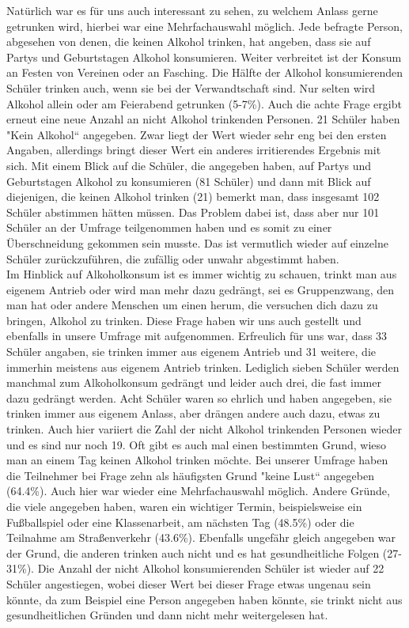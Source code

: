 \documentclass[12pt]{article}
\begin{document}
Natürlich war es für uns auch interessant zu sehen, zu welchem Anlass gerne getrunken wird, hierbei war eine Mehrfachauswahl möglich. Jede befragte Person, abgesehen von denen, die keinen Alkohol trinken, hat angeben, dass sie auf Partys und Geburtstagen Alkohol konsumieren. Weiter verbreitet ist der Konsum an Festen von Vereinen oder an Fasching. Die Hälfte der Alkohol konsumierenden Schüler trinken auch, wenn sie bei der Verwandtschaft sind. Nur selten wird Alkohol allein oder am Feierabend getrunken (5-7\%). Auch die achte Frage ergibt erneut eine neue Anzahl an nicht Alkohol trinkenden Personen. 21 Schüler haben "Kein Alkohol“ angegeben. Zwar liegt der Wert wieder sehr eng bei den ersten Angaben, allerdings bringt dieser Wert ein anderes irritierendes Ergebnis mit sich. Mit einem Blick auf die Schüler, die angegeben haben, auf Partys und Geburtstagen Alkohol zu konsumieren (81 Schüler) und dann mit Blick auf diejenigen, die keinen Alkohol trinken (21) bemerkt man, dass insgesamt 102 Schüler abstimmen hätten müssen. Das Problem dabei ist, dass aber nur 101 Schüler an der Umfrage teilgenommen haben und es somit zu einer Überschneidung gekommen sein musste. Das ist vermutlich wieder auf einzelne Schüler zurückzuführen, die zufällig oder unwahr abgestimmt haben.\\ 
Im Hinblick auf Alkoholkonsum ist es immer wichtig zu schauen, trinkt man aus eigenem Antrieb oder wird man mehr dazu gedrängt, sei es Gruppenzwang, den man hat oder andere Menschen um einen herum, die versuchen dich dazu zu bringen, Alkohol zu trinken. Diese Frage haben wir uns auch gestellt und ebenfalls in unsere Umfrage mit aufgenommen. Erfreulich für uns war, dass 33 Schüler angaben, sie trinken immer aus eigenem Antrieb und 31 weitere, die immerhin meistens aus eigenem Antrieb trinken. Lediglich sieben Schüler werden manchmal zum Alkoholkonsum gedrängt und leider auch drei, die fast immer dazu gedrängt werden. Acht Schüler waren so ehrlich und haben angegeben, sie trinken immer aus eigenem Anlass, aber drängen andere auch dazu, etwas zu trinken. Auch hier variiert die Zahl der nicht Alkohol trinkenden Personen wieder und es sind nur noch 19.
Oft gibt es auch mal einen bestimmten Grund, wieso man an einem Tag keinen Alkohol trinken möchte. Bei unserer Umfrage haben die Teilnehmer bei Frage zehn als häufigsten Grund "keine Lust“ angegeben (64.4\%). Auch hier war wieder eine Mehrfachauswahl möglich. Andere Gründe, die viele angegeben haben, waren ein wichtiger Termin, beispielsweise ein Fußballspiel oder eine Klassenarbeit, am nächsten Tag (48.5\%) oder die Teilnahme am Straßenverkehr (43.6\%). Ebenfalls ungefähr gleich angegeben war der Grund, die anderen trinken auch nicht und es hat gesundheitliche Folgen (27-31\%). Die Anzahl der nicht Alkohol konsumierenden Schüler ist wieder auf 22 Schüler angestiegen, wobei dieser Wert bei dieser Frage etwas ungenau sein könnte, da zum Beispiel eine Person angegeben haben könnte, sie trinkt nicht aus gesundheitlichen Gründen und dann nicht mehr weitergelesen hat. \\
\end{document}
